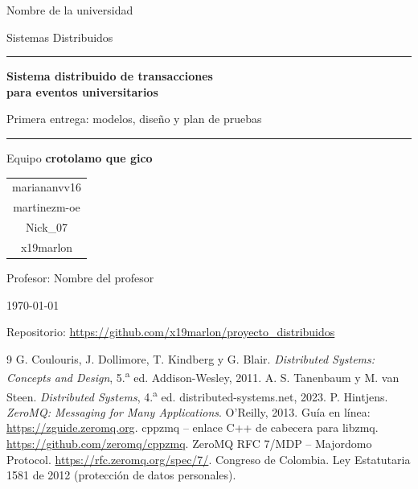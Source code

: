 \documentclass[11pt,letterpaper]{article}
\newcommand{\universidad}{Nombre de la universidad}
\newcommand{\curso}{Sistemas Distribuidos}
\newcommand{\profesor}{Nombre del profesor}
\newcommand{\repositorio}{\url{https://github.com/x19marlon/proyecto_distribuidos}}
\begin{document}
\begin{titlepage}
    \centering
    {\large \universidad\par}
    \vspace{0.3cm}
    {\large \curso\par}
    \vspace{3cm}
    {\color{azul}\rule{\linewidth}{1.2pt}\par}
    \vspace{0.4cm}
    {\Huge\bfseries Sistema distribuido de transacciones\\[0.2cm] para eventos universitarios\par}
    \vspace{0.4cm}
    {\Large Primera entrega: modelos, diseño y plan de pruebas\par}
    \vspace{0.2cm}
    {\color{azul}\rule{\linewidth}{1.2pt}\par}
    \vspace{2.5cm}
    {\large Equipo \textbf{crotolamo que gico}\par}
    \vspace{0.6cm}
    \begin{tabular}{c}
        mariananvv16 \\
        martinezm-oe \\
        Nick\_07 \\
        x19marlon
    \end{tabular}
    \vfill
    {\large Profesor: \profesor\par}
    \vspace{0.3cm}
    {\large \today\par}
    \vspace{0.3cm}
    {\small Repositorio: \repositorio\par}
\end{titlepage}

\tableofcontents
\newpage










\begin{thebibliography}{9}
 G. Coulouris, J. Dollimore, T. Kindberg y G. Blair.
    \textit{Distributed Systems: Concepts and Design}, 5.\textsuperscript{a} ed. Addison-Wesley, 2011.
 A. S. Tanenbaum y M. van Steen.
    \textit{Distributed Systems}, 4.\textsuperscript{a} ed. distributed-systems.net, 2023.
 P. Hintjens. \textit{ZeroMQ: Messaging for Many Applications}. O'Reilly, 2013.
    Guía en línea: \url{https://zguide.zeromq.org}.
 cppzmq – enlace C++ de cabecera para libzmq. \url{https://github.com/zeromq/cppzmq}.
 ZeroMQ RFC 7/MDP – Majordomo Protocol. \url{https://rfc.zeromq.org/spec/7/}.
 Congreso de Colombia. Ley Estatutaria 1581 de 2012 (protección de datos personales).
\end{thebibliography}
\end{document}
